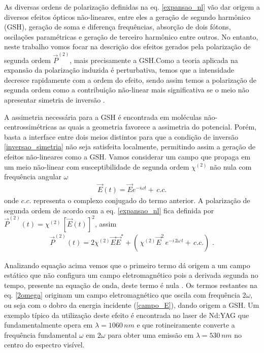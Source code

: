 As diversas ordens de polarização definidas na eq. \ref{expansao_nl} vão dar origem a diversos efeitos ópticos não-lineares, entre eles a geração de segundo harmônico (GSH), geração de soma e diferença frequências, absorção de dois fótons, oscilações paramétricas e geração de terceiro harmônico entre outros. No entanto, neste trabalho vomos focar na descrição dos efeitos gerados pela polarização de segunda ordem $\vec{P}^{(2)}$, mais precisamente a GSH.Como a teoria aplicada na expansão da polarização induzida é perturbativa, temos que a intensidade decresce rapidamente com a ordem do efeito, sendo assim temos a polarização de segunda ordem como a contribuição não-linear mais significativa se o meio não apresentar simetria de inversão \cite{boyd}.

A assimetria necessária para a GSH é encontrada em moléculas não-centrossimétricas as quais a geometria favorece a assimetria do potencial. Porém, basta a interface entre dois meios distintos para que a condição de inversão \ref{inversao_simetria} não seja satisfeita localmente, permitindo assim a geração de efeitos não-lineares como a GSH. Vamos considerar um campo que propaga em um meio não-linear com susceptibilidade de segunda ordem $\chi^{(2)}$ não nula com frequência angular $\omega$ 
\begin{eqnarray}
 \vec{E}(t)=\vec{E}e^{-i\omega t}+\,c.c.
\label{campo_E}
\end{eqnarray}
onde $c.c.$ representa o complexo conjugado do termo anterior. A polarização de segunda ordem de acordo com a eq. \ref{expansao_nl} fica definida por $\vec{P}^{(2)}(t)=\chi^{(2)}\,[\vec{E}(t)]^2$, assim
\begin{eqnarray}
 \vec{P}^{(2)}(t)=2\chi^{(2)}\vec{E}\vec{E}^{*}+(\,\chi^{(2)}\vec{E}^2\,e^{-i\,2\omega\,t}+\,c.c.)\,\,.
\label{2omega}
\end{eqnarray}

Analizando equação acima vemos que o primeiro termo dá origem a um campo estático que não configura um campo eletromagnético pois a derivada segunda no tempo, presente na equação de onda, deste termo é nula \cite{boyd}. Os termos restantes na eq. \ref{2omega} originam um campo eletromagnético que oscila com frequência $2\omega$, ou seja com o dobro da energia incidente (\ref{campo_E}), dando origem a GSH. Um exemplo típico da utilização deste efeito é encontrada no laser de Nd:YAG que fundamentalmente opera em $\lambda=1060\,nm$ e que rotineiramente converte a frequência fundamental $\omega$ em $2\omega$ para obter uma emissão em $\lambda=530\,nm$ no centro do espectro visível.

